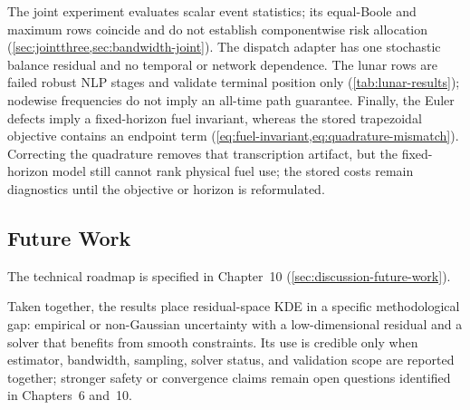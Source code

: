 The joint experiment evaluates scalar event statistics; its equal-Boole and
maximum rows coincide and do not establish componentwise risk allocation
(\cref{sec:jointthree,sec:bandwidth-joint}). The dispatch adapter has one
stochastic balance residual and no temporal or network dependence. The lunar
rows are failed robust NLP stages and validate terminal position only
(\cref{tab:lunar-results}); nodewise frequencies do not imply an all-time path
guarantee. Finally, the Euler defects imply a fixed-horizon fuel invariant,
whereas the stored trapezoidal objective contains an endpoint term
(\cref{eq:fuel-invariant,eq:quadrature-mismatch}). Correcting the quadrature
removes that transcription artifact, but the fixed-horizon model still cannot
rank physical fuel use; the stored costs remain diagnostics until the objective
or horizon is reformulated.

\subsection{Future Work}
\label{sec:conclusion-future-work}

The technical roadmap is specified in Chapter~10 (\cref{sec:discussion-future-work}).

Taken together, the results place residual-space KDE in a specific methodological gap: empirical or non-Gaussian uncertainty with a low-dimensional residual and a solver that benefits from smooth constraints. Its use is credible only when estimator, bandwidth, sampling, solver status, and validation scope are reported together; stronger safety or convergence claims remain open questions identified in Chapters~6 and~10.
